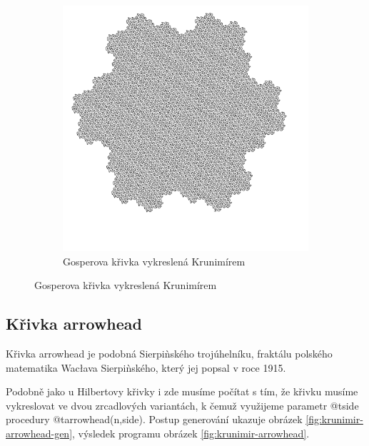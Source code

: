 \begin{figure}
  \begin{subfigure}{0.9\textwidth}
    \includegraphics[width=\textwidth]{krunimir/examples/gosper}
    \caption{Gosperova křivka vykreslená Krunimírem}
    \label{fig:krunimir-gosper}
  \end{subfigure}
\end{figure}

\subsection{Křivka arrowhead}

Křivka arrowhead je podobná Sierpi\`nského trojúhelníku, fraktálu polského
matematika Wac\l{}ava Sierpi\`nského, který jej popsal v roce 1915.
\cite{wiki:arrowhead-curve}

Podobně jako u Hilbertovy křivky i zde musíme počítat s tím, že křivku musíme
vykreslovat ve dvou zrcadlových variantách, k čemuž využijeme parametr @t{side}
procedury @t{arrowhead(n,side)}. Postup generování ukazuje obrázek
\ref{fig:krunimir-arrowhead-gen}, výsledek programu obrázek
\ref{fig:krunimir-arrowhead}.



